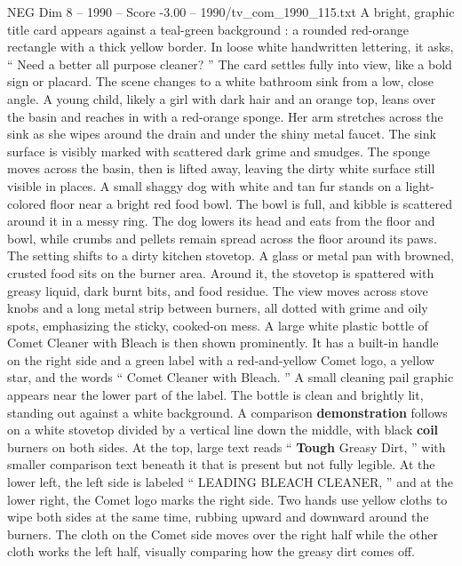 \begin{textsample}{NEG Dim 8 – 1990 – Score -3.00 – 1990/tv\_com\_1990\_115.txt}  \label{ex:f8_neg_033}
A bright, graphic title card appears against a teal-green background : a rounded red-orange rectangle with a thick yellow border.
In loose white handwritten lettering, it asks, “ Need a better all purpose cleaner? ” The card settles fully into view, like a bold sign or placard.
The scene changes to a white bathroom sink from a low, close angle.
A young child, likely a girl with dark hair and an orange top, leans over the basin and reaches in with a red-orange sponge.
Her arm stretches across the sink as she wipes around the drain and under the shiny metal faucet.
The sink surface is visibly marked with scattered dark grime and smudges.
The sponge moves across the basin, then is lifted away, leaving the dirty white surface still visible in places.
A small shaggy dog with white and tan fur stands on a light-colored floor near a bright red food bowl.
The bowl is full, and kibble is scattered around it in a messy ring.
The dog lowers its head and eats from the floor and bowl, while crumbs and pellets remain spread across the floor around its paws.
The setting shifts to a dirty kitchen stovetop.
A glass or metal pan with browned, crusted food sits on the burner area.
Around it, the stovetop is spattered with greasy liquid, dark burnt bits, and food residue.
The view moves across stove knobs and a long metal strip between burners, all dotted with grime and oily spots, emphasizing the sticky, cooked-on mess.
A large white plastic bottle of Comet Cleaner with Bleach is then shown prominently.
It has a built-in handle on the right side and a green label with a red-and-yellow Comet logo, a yellow star, and the words “ Comet Cleaner with Bleach. ” A small cleaning pail graphic appears near the lower part of the label.
The bottle is clean and brightly lit, standing out against a white background.
A comparison \textbf{demonstration} follows on a white stovetop divided by a vertical line down the middle, with black \textbf{coil} burners on both sides.
At the top, large text reads “ \textbf{Tough} Greasy Dirt, ” with smaller comparison text beneath it that is present but not fully legible.
At the lower left, the left side is labeled “ LEADING BLEACH CLEANER, ” and at the lower right, the Comet logo marks the right side.
Two hands use yellow cloths to wipe both sides at the same time, rubbing upward and downward around the burners.
The cloth on the Comet side moves over the right half while the other cloth works the left half, visually comparing how the greasy dirt comes off.

\end{textsample}
